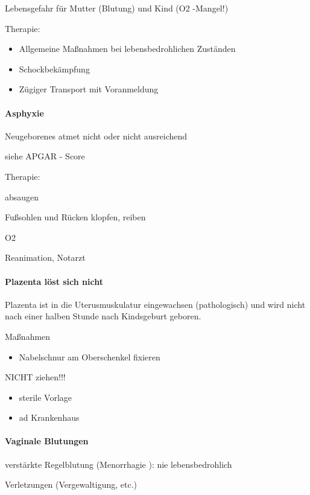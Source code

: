 \documentclass{article}
\begin{document}
Lebensgefahr f\"ur Mutter (Blutung) und  Kind (O2 -Mangel!)

Therapie:

\begin{itemize}
\item Allgemeine Ma{\ss}nahmen bei lebensbedrohlichen Zust\"anden

\item Schockbek\"ampfung

\item Z\"ugiger Transport mit Voranmeldung

\end{itemize}
\paragraph{Asphyxie}
Neugeborenes atmet nicht oder nicht  ausreichend

siehe APGAR - Score

Therapie:

absaugen

Fu{\ss}sohlen und R\"ucken klopfen, reiben

O2

Reanimation, Notarzt

\paragraph{Plazenta l\"ost sich nicht}
Plazenta ist in die Uterusmuskulatur  eingewachsen (pathologisch) und
wird nicht nach einer halben Stunde nach Kindsgeburt geboren. 

Ma{\ss}nahmen

\begin{itemize}
\item Nabelschnur am Oberschenkel fixieren

\end{itemize}
NICHT ziehen!!!

\begin{itemize}
\item sterile Vorlage

\item ad Krankenhaus

\end{itemize}
\paragraph{Vaginale Blutungen}
verst\"arkte Regelblutung (Menorrhagie ): nie lebensbedrohlich

Verletzungen (Vergewaltigung, etc.)
\end{document}
